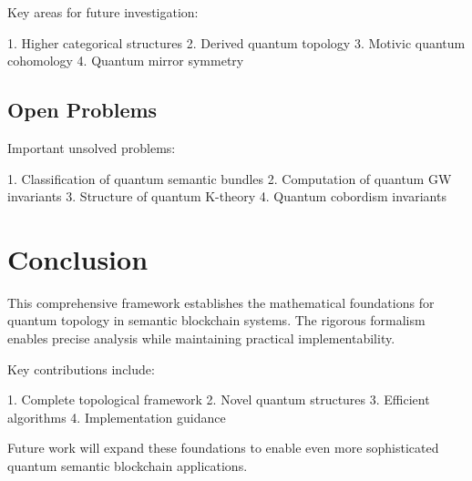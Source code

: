 \documentclass[12pt]{article}
\begin{document}
Key areas for future investigation:

1. Higher categorical structures
2. Derived quantum topology
3. Motivic quantum cohomology
4. Quantum mirror symmetry

\subsection{Open Problems}

Important unsolved problems:

1. Classification of quantum semantic bundles
2. Computation of quantum GW invariants
3. Structure of quantum K-theory
4. Quantum cobordism invariants

\section{Conclusion}

This comprehensive framework establishes the mathematical foundations for quantum topology in semantic blockchain systems. The rigorous formalism enables precise analysis while maintaining practical implementability.

Key contributions include:

1. Complete topological framework
2. Novel quantum structures
3. Efficient algorithms
4. Implementation guidance

Future work will expand these foundations to enable even more sophisticated quantum semantic blockchain applications.



\end{document}
